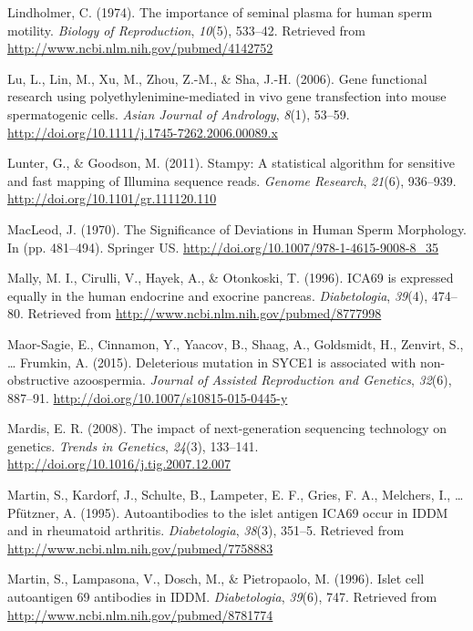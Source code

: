 \documentclass[12pt,twoside]{reedthesis}
\theoremstyle{definition}
\theoremstyle{definition}
\theoremstyle{remark}
\begin{document}
  \hypertarget{ref-Lindholmer1974}{}
  Lindholmer, C. (1974). The importance of seminal plasma for human sperm
  motility. \emph{Biology of Reproduction}, \emph{10}(5), 533--42.
  Retrieved from \url{http://www.ncbi.nlm.nih.gov/pubmed/4142752}
  
  \hypertarget{ref-Lu2006}{}
  Lu, L., Lin, M., Xu, M., Zhou, Z.-M., \& Sha, J.-H. (2006). Gene
  functional research using polyethylenimine-mediated in vivo gene
  transfection into mouse spermatogenic cells. \emph{Asian Journal of
  Andrology}, \emph{8}(1), 53--59.
  \url{http://doi.org/10.1111/j.1745-7262.2006.00089.x}
  
  \hypertarget{ref-Lunter2011}{}
  Lunter, G., \& Goodson, M. (2011). Stampy: A statistical algorithm for
  sensitive and fast mapping of Illumina sequence reads. \emph{Genome
  Research}, \emph{21}(6), 936--939.
  \url{http://doi.org/10.1101/gr.111120.110}
  
  \hypertarget{ref-MacLeod1970}{}
  MacLeod, J. (1970). The Significance of Deviations in Human Sperm
  Morphology. In (pp. 481--494). Springer US.
  \url{http://doi.org/10.1007/978-1-4615-9008-8_35}
  
  \hypertarget{ref-Mally1996}{}
  Mally, M. I., Cirulli, V., Hayek, A., \& Otonkoski, T. (1996). ICA69 is
  expressed equally in the human endocrine and exocrine pancreas.
  \emph{Diabetologia}, \emph{39}(4), 474--80. Retrieved from
  \url{http://www.ncbi.nlm.nih.gov/pubmed/8777998}
  
  \hypertarget{ref-Maor-Sagie2015}{}
  Maor-Sagie, E., Cinnamon, Y., Yaacov, B., Shaag, A., Goldsmidt, H.,
  Zenvirt, S., \ldots{} Frumkin, A. (2015). Deleterious mutation in SYCE1
  is associated with non-obstructive azoospermia. \emph{Journal of
  Assisted Reproduction and Genetics}, \emph{32}(6), 887--91.
  \url{http://doi.org/10.1007/s10815-015-0445-y}
  
  \hypertarget{ref-Mardis2008}{}
  Mardis, E. R. (2008). The impact of next-generation sequencing
  technology on genetics. \emph{Trends in Genetics}, \emph{24}(3),
  133--141. \url{http://doi.org/10.1016/j.tig.2007.12.007}
  
  \hypertarget{ref-Martin1995}{}
  Martin, S., Kardorf, J., Schulte, B., Lampeter, E. F., Gries, F. A.,
  Melchers, I., \ldots{} Pfützner, A. (1995). Autoantibodies to the islet
  antigen ICA69 occur in IDDM and in rheumatoid arthritis.
  \emph{Diabetologia}, \emph{38}(3), 351--5. Retrieved from
  \url{http://www.ncbi.nlm.nih.gov/pubmed/7758883}
  
  \hypertarget{ref-Martin1996}{}
  Martin, S., Lampasona, V., Dosch, M., \& Pietropaolo, M. (1996). Islet
  cell autoantigen 69 antibodies in IDDM. \emph{Diabetologia},
  \emph{39}(6), 747. Retrieved from
  \url{http://www.ncbi.nlm.nih.gov/pubmed/8781774}
  
\end{document}

